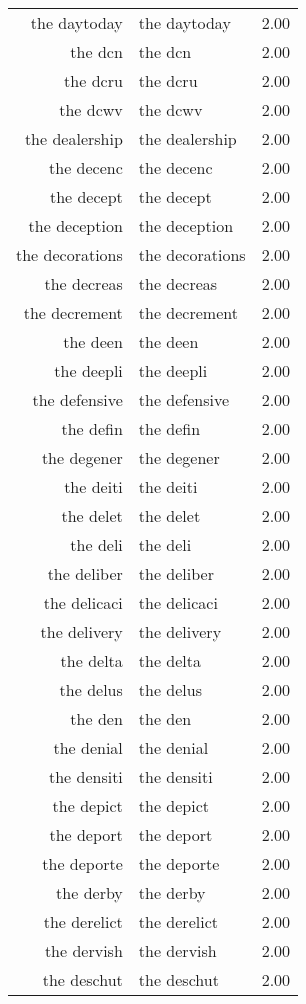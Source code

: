 \begin{table}[ht]
\begin{tabular}{rlr}
  the daytoday & the daytoday & 2.00 \\ 
  the dcn & the dcn & 2.00 \\ 
  the dcru & the dcru & 2.00 \\ 
  the dcwv & the dcwv & 2.00 \\ 
  the dealership & the dealership & 2.00 \\ 
  the decenc & the decenc & 2.00 \\ 
  the decept & the decept & 2.00 \\ 
  the deception & the deception & 2.00 \\ 
  the decorations & the decorations & 2.00 \\ 
  the decreas & the decreas & 2.00 \\ 
  the decrement & the decrement & 2.00 \\ 
  the deen & the deen & 2.00 \\ 
  the deepli & the deepli & 2.00 \\ 
  the defensive & the defensive & 2.00 \\ 
  the defin & the defin & 2.00 \\ 
  the degener & the degener & 2.00 \\ 
  the deiti & the deiti & 2.00 \\ 
  the delet & the delet & 2.00 \\ 
  the deli & the deli & 2.00 \\ 
  the deliber & the deliber & 2.00 \\ 
  the delicaci & the delicaci & 2.00 \\ 
  the delivery & the delivery & 2.00 \\ 
  the delta & the delta & 2.00 \\ 
  the delus & the delus & 2.00 \\ 
  the den & the den & 2.00 \\ 
  the denial & the denial & 2.00 \\ 
  the densiti & the densiti & 2.00 \\ 
  the depict & the depict & 2.00 \\ 
  the deport & the deport & 2.00 \\ 
  the deporte & the deporte & 2.00 \\ 
  the derby & the derby & 2.00 \\ 
  the derelict & the derelict & 2.00 \\ 
  the dervish & the dervish & 2.00 \\ 
  the deschut & the deschut & 2.00 \\ 

\end{tabular}
\end{table}
